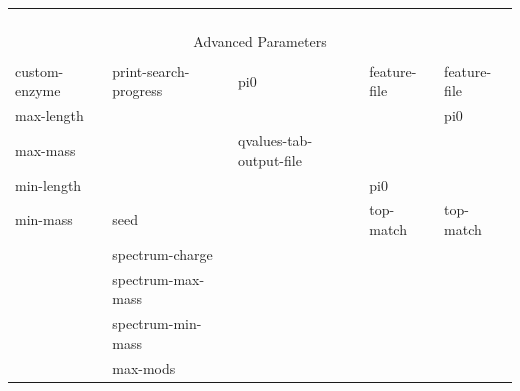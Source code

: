 \documentclass{article}
\begin{document}
\begin{table}[b]
\begin{tabular}{lllll}
                     &                                  &                                 &                                 &                                 \\
                     &                                  &                                 &                                 &                                 \\
                     &                                  &                                 &                                 &                                 \\
                     &                                  &                                 &                                 &                                 \\
\hline
\multicolumn{5}{c}{Advanced Parameters} \\
\hline \\
custom-enzyme        &print-search-progress             &pi0                              &feature-file                     &feature-file                     \\
max-length           &                                  &                                 &                                 &pi0                              \\
max-mass             &                                  &qvalues-tab-output-file          &                                 &                                 \\
min-length           &                                  &                                 &pi0                              &                                 \\
min-mass             &seed                              &                                 &top-match                        &top-match                        \\
                     &spectrum-charge                   &                                 &                                 &                                 \\
                     &spectrum-max-mass                 &                                 &                                 &                                 \\
                     &spectrum-min-mass                 &                                 &                                 &                                 \\
                     &max-mods                          &                                 &                                 &                                 \\

\end{tabular}
\end{table}
\end{document}

